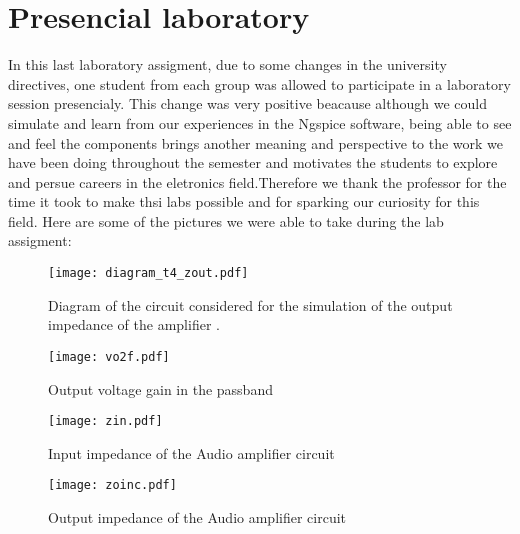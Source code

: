 \section{Presencial laboratory}
\label{sec:Presencial}

In this last laboratory assigment, due to some changes in the university directives, one student from each group was allowed to participate in a laboratory session presencialy. This change was very positive beacause although we could simulate and learn from our experiences in the Ngspice software, being able to see and feel the components brings another meaning and perspective to the work we have been doing throughout the semester and motivates the students to explore and persue careers in the eletronics field.Therefore we thank the professor for the time it took to make thsi labs possible and for sparking our curiosity for this field. Here are some of the pictures we were able to take during the lab assigment:  

\begin{figure}[H] \centering
\texttt{[image: diagram\_t4\_zout.pdf]}
\vspace{-10cm}
\caption{Diagram of the circuit considered for the simulation of the output impedance of the amplifier .}
\label{fig:diagram_t4_zout}
\end{figure}

  
\begin{figure}[H] \centering
\texttt{[image: vo2f.pdf]}
\vspace{-1cm}
\caption{Output voltage gain in the passband}
\label{fig:gain_sim}
\end{figure}


\begin{figure}[H] \centering
\texttt{[image: zin.pdf]}
\caption{Input impedance of the Audio amplifier circuit}
\label{fig:In_imp}
\end{figure}
\vspace{-3cm}


\begin{figure}[H] \centering
\texttt{[image: zoinc.pdf]}
\caption{Output impedance of the Audio amplifier circuit}
\label{fig:out_imp}
\end{figure}
\vspace{-3cm}


\pagebreak
